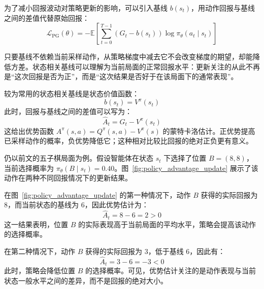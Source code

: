 \documentclass[UTF8,a4paper,zihao=-4,oneside,openany]{ctexbook}
\begin{document}
为了减小回报波动对策略更新的影响，可以引入基线 $b(s_t)$，用动作回报与基线之间的差值代替原始回报：
\begin{equation}
\mathcal{L}_{\mathrm{PG}}(\theta)
=
-
\mathbb{E}
\left[
\sum_{t=0}^{T-1}
\left(
G_t-b(s_t)
\right)
\log\pi_{\theta}(a_t\mid s_t)
\right]
\end{equation}

只要基线不依赖当前采样动作，从策略梯度中减去它不会改变梯度的期望，却能降低方差。状态相关基线可以理解为当前局面的正常回报水平：更新关注的从此不再是“这次回报是否为正”，而是“这次结果是否好于在该局面下的通常表现”。

较为常用的状态相关基线是状态价值函数：
\begin{equation}
b(s_t)=V^{\pi}(s_t)
\end{equation}
此时，回报与基线之间的差值可以写为：
\begin{equation}
\widehat{A}_t
=
G_t-V^{\pi}(s_t)
\end{equation}
这给出优势函数 $A^\pi(s,a)=Q^\pi(s,a)-V^\pi(s)$ 的蒙特卡洛估计。正优势提高已采样动作的概率，负优势降低它；这种相对比较比回报的绝对正负更有意义。

仍以前文的五子棋局面为例。假设智能体在状态 $s_t$ 下选择了位置 $B=(8,8)$，当前选择概率为 $\pi_{\theta}(B\mid s_t)=0.40$。图~\ref{fig:policy_advantage_update} 展示了该动作在两种不同回报情况下的更新结果。

%       

在图~\ref{fig:policy_advantage_update} 的第一种情况下，动作 $B$ 获得的实际回报为 $8$，而当前状态的基线为 $6$，因此优势估计为：
\begin{equation}
\widehat{A}_t
=
8-6
=
2>0
\end{equation}
这一结果表明，位置 $B$ 的实际表现高于当前局面的平均水平，策略会提高该动作的选择概率。

在第二种情况下，动作 $B$ 获得的实际回报为 $3$，低于基线 $6$，因此有：
\begin{equation}
\widehat{A}_t
=
3-6
=
-3<0
\end{equation}
此时，策略会降低位置 $B$ 的选择概率。可见，优势估计关注的是动作表现与当前状态一般水平之间的差异，而不是回报的绝对大小。
\end{document}

